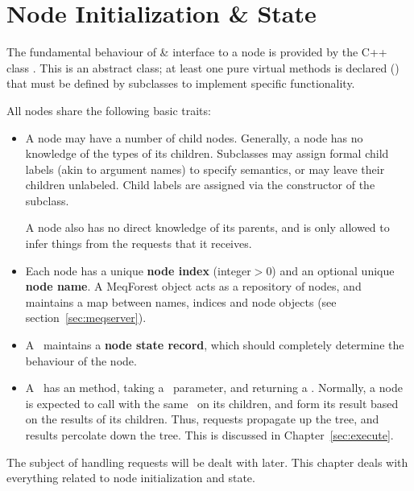 \chapter{Node Initialization \& State}

  The fundamental behaviour of \& interface to a node is provided by the C++
  class . This is an abstract class; at least one pure virtual
  methods is declared () that must be defined by
  subclasses to implement specific functionality.

  All nodes share the following basic traits:

  \begin{itemize}

  \item A node may have a number of child nodes. Generally, a node has no
    knowledge of the types of its children. Subclasses may assign formal child
    labels (akin to argument names) to specify semantics, or may leave their
    children unlabeled. Child labels are assigned via the constructor of the
    subclass.
    
    A node also has no direct knowledge of its parents, and is only allowed to
    infer things from the requests that it receives.

  \item Each node has a unique {\bf node index} (integer$>$0) and an optional
    unique {\bf node name}. A MeqForest object acts as a repository of nodes,
    and maintains a map between names, indices and node objects (see
    section~\ref{sec:meqserver}).

  \item A \Node\ maintains a {\bf node state record}, which should completely
    determine the behaviour of the node. 
    
  \item A \Node\ has an  method, taking a \Request\ parameter,
    and returning a \Result. Normally, a node is expected to call
     with the same \Request\ on its children, and form its result
    based on the results of its children. Thus, requests propagate up the tree,
    and results percolate down the tree. This is discussed in
    Chapter~\ref{sec:execute}. 

  \end{itemize}
  
  The subject of handling requests will be dealt with later. This chapter deals
  with everything related to node initialization and state.
  
